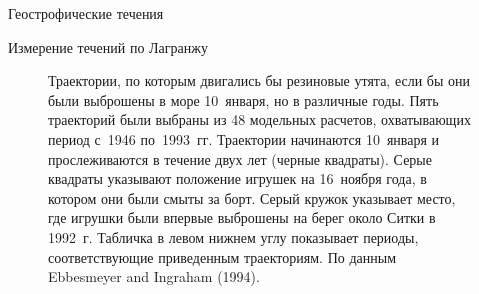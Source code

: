 \begin{chapter}{Геострофические течения}
\begin{section}{Измерение течений по Лагранжу}
\begin{figure}[b!]
\caption{Траектории, по которым двигались бы резиновые утята, если бы
они были выброшены в море 10~января, но в различные годы. Пять
траекторий были выбраны из 48 модельных расчетов, охватывающих период
с~1946 по~1993~гг. Траектории начинаются 10~января и прослеживаются в
течение двух лет (черные квадраты). Серые квадраты указывают положение
игрушек на 16~ноября года, в котором они были смыты за борт. 
Серый кружок указывает место, где игрушки были впервые выброшены на берег 
около Ситки в 1992~г. 
Табличка в левом нижнем углу показывает периоды, соответствующие
приведенным траекториям. По данным Ebbesmeyer and Ingraham (1994).}
\label{fig:duckies}
\end{figure}
%


\end{section}
\end{chapter}
